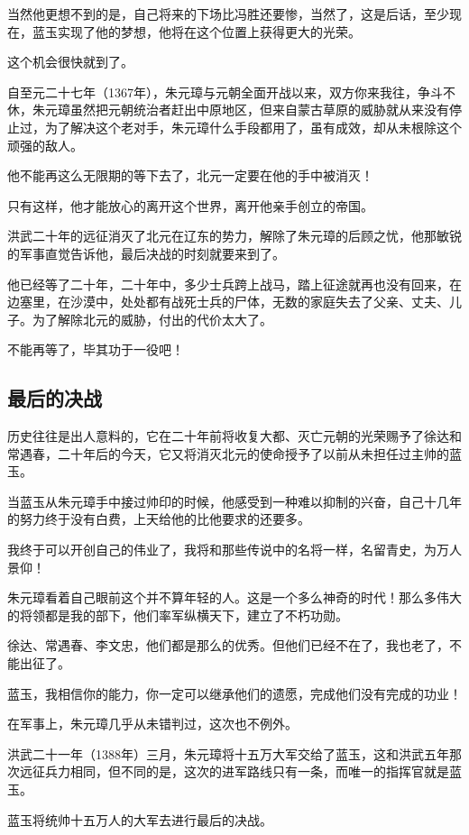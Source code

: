 \begin{multicols}{\theparacolNo}
		当然他更想不到的是，自己将来的下场比冯胜还要惨，当然了，这是后话，至少现在，蓝玉实现了他的梦想，他将在这个位置上获得更大的光荣。

		这个机会很快就到了。

		自至元二十七年（1367年），朱元璋与元朝全面开战以来，双方你来我往，争斗不休，朱元璋虽然把元朝统治者赶出中原地区，但来自蒙古草原的威胁就从来没有停止过，为了解决这个老对手，朱元璋什么手段都用了，虽有成效，却从未根除这个顽强的敌人。

		他不能再这么无限期的等下去了，北元一定要在他的手中被消灭！

		只有这样，他才能放心的离开这个世界，离开他亲手创立的帝国。

		洪武二十年的远征消灭了北元在辽东的势力，解除了朱元璋的后顾之忧，他那敏锐的军事直觉告诉他，最后决战的时刻就要来到了。

		他已经等了二十年，二十年中，多少士兵跨上战马，踏上征途就再也没有回来，在边塞里，在沙漠中，处处都有战死士兵的尸体，无数的家庭失去了父亲、丈夫、儿子。为了解除北元的威胁，付出的代价太大了。

		不能再等了，毕其功于一役吧！

		\subsection{最后的决战}
		历史往往是出人意料的，它在二十年前将收复大都、灭亡元朝的光荣赐予了徐达和常遇春，二十年后的今天，它又将消灭北元的使命授予了以前从未担任过主帅的蓝玉。

		当蓝玉从朱元璋手中接过帅印的时候，他感受到一种难以抑制的兴奋，自己十几年的努力终于没有白费，上天给他的比他要求的还要多。

		我终于可以开创自己的伟业了，我将和那些传说中的名将一样，名留青史，为万人景仰！

		朱元璋看着自己眼前这个并不算年轻的人。这是一个多么神奇的时代！那么多伟大的将领都是我的部下，他们率军纵横天下，建立了不朽功勋。

		徐达、常遇春、李文忠，他们都是那么的优秀。但他们已经不在了，我也老了，不能出征了。

		蓝玉，我相信你的能力，你一定可以继承他们的遗愿，完成他们没有完成的功业！

		在军事上，朱元璋几乎从未错判过，这次也不例外。

		洪武二十一年（1388年）三月，朱元璋将十五万大军交给了蓝玉，这和洪武五年那次远征兵力相同，但不同的是，这次的进军路线只有一条，而唯一的指挥官就是蓝玉。

		蓝玉将统帅十五万人的大军去进行最后的决战。


\end{multicols}
